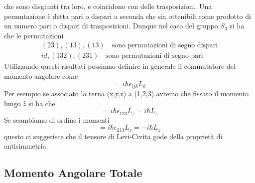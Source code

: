 che sono disgiunti tra loro, e coincidono con delle trasposizioni. Una permutazione \`e detta pari o dispari a seconda che sia ottenibili come prodotto di un numero pari o dispari di trasposizioni.
Dunque nel caso del gruppo $S_3$ si ha che le permutazioni 
\begin{equation*}
	\begin{aligned}
		& (23),(13),(13) \quad \text{sono permutazioni di segno dispari} & \\ 
		& id,(132),(231) \quad \text{sono permutazioni di segno pari}
	\end{aligned}
\end{equation*}
Utilizzando questi risultati possiamo definire in generale il commutatore del momento angolare come 
\begin{equation}
	[L_i,L_j] = i\hbar \epsilon_{ijk}L_k
\end{equation}
Per esempio se associato la terna (x,y,z) a (1,2,3) avremo che fissato il momento lungo $\hat{z}$ si ha che 
\begin{equation*}
	[L_x,L_y] = i\hbar\epsilon_{123}L_{z} = i\hbar L_z
\end{equation*}
Se scambiamo di ordine i momenti 
\begin{equation*}
	[L_y,L_x] = i \hbar \epsilon_{213}L_{z}  = -i\hbar L_{z}
\end{equation*}
questo ci suggerisce che il tensore di Levi-Civita gode della propriet\`a di antisimmetria.

\subsection{Momento Angolare Totale}

